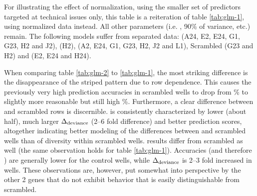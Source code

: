 \renewcommand{\arraystretch}{1.5}
\setlength{\tabcolsep}{0.25em}
\begin{table}
  \centering
  \caption[Reiteration of table \ref{tab:glm-1}, using normalized features for  fitting.]{For illustrating the effect of  normalization, using the smaller set of predictors targeted at technical issues only, this table is a reiteration of table \ref{tab:glm-1}, using normalized data instead. All other parameters (i.e. , 90\% of variance, etc.) remain. The following models suffer from separated data:  (A24, E2, E24, G1, G23, H2 and J2),  (H2),  (A2, E24, G1, G23, H2, J2 and L1), Scrambled (G23 and H2) and  (E2, E24 and H24).}
  \label{tab:glm-2}
  \footnotesize
  \vspace{5px}
  
\end{table}

When comparing table \ref{tab:glm-2} to \ref{tab:glm-1}, the most striking difference is the disappearance of the striped pattern due to row dependence. This causes the previously very high prediction accuracies in scrambled wells to drop from \% to slightly more reasonable but still high \%. Furthermore, a clear difference between  and scrambled rows is discernible.  is consistently characterized by lower  (about half), much larger $\Delta\textsubscript{deviance}$ (2--6 fold difference) and better prediction scores, altogether indicating better modeling of the differences between  and scrambled wells than of diversity within scrambled wells.  results differ from scrambled as well (the same observation holds for table \ref{tab:glm-1}). Accuracies (and therefore ) are generally lower for the control wells, while $\Delta\textsubscript{deviance}$ is 2--3 fold increased in  wells. These observations are, however, put somewhat into perspective by the other 2 genes that do not exhibit behavior that is easily distinguishable from scrambled.

